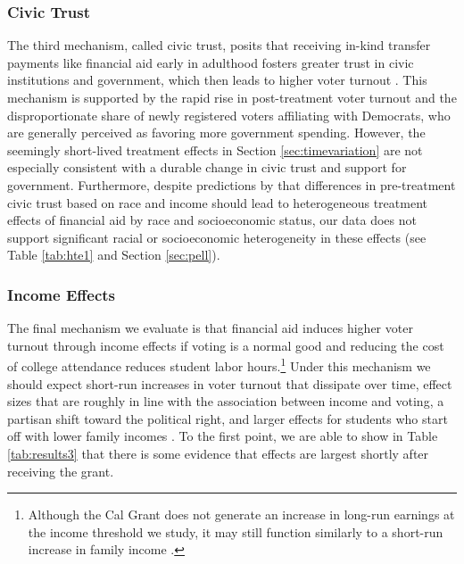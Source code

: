 \documentclass[12pt,letterpaper,oneside]{book}
\begin{document}
\subsubsection{Civic Trust}

The third mechanism, called civic trust, posits that receiving in-kind transfer payments like financial aid early in adulthood fosters greater trust in civic institutions and government, which then leads to higher voter turnout \citep{alesina_economics_2000,wang_political_2016}. This mechanism is supported by the rapid rise in post-treatment voter turnout and the disproportionate share of newly registered voters affiliating with Democrats, who are generally perceived as favoring more government spending. However, the seemingly short-lived treatment effects in Section \ref{sec:timevariation} are not especially consistent with a durable change in civic trust and support for government. Furthermore, despite predictions by \cite{alesina_economics_2000} that differences in pre-treatment civic trust based on race and income should lead to heterogeneous treatment effects of financial aid by race and socioeconomic status, our data does not support significant racial or socioeconomic heterogeneity in these effects (see Table \ref{tab:hte1} and Section \ref{sec:pell}).

\subsubsection{Income Effects}
The final mechanism we evaluate is that financial aid induces higher voter turnout through income effects if voting is a normal good and reducing the cost of college attendance reduces student labor hours.\footnote{Although the Cal Grant does not generate an increase in long-run earnings at the income threshold we study, it may still function similarly to a short-run increase in family income \citep{bettinger_long-run_2019}.} Under this mechanism we should expect short-run increases in voter turnout that dissipate over time, effect sizes that are roughly in line with the association between income and voting, a partisan shift toward the political right, and larger effects for students who start off with lower family incomes \citep{romer_individual_1975,meltzer_rational_1981}. To the first point, we are able to show in Table \ref{tab:results3} that there is some evidence that effects are largest shortly after receiving the grant.
\end{document}
